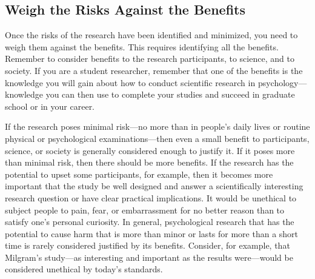 \subsection{Weigh the Risks Against the Benefits}
Once the risks of the research have been identified and minimized, you need to weigh them against the benefits.
This requires identifying all the benefits. Remember to consider benefits to the research participants, to science, and to society. If you are a student researcher, remember that one of the benefits is the knowledge you will gain about how to conduct scientific research in psychology---knowledge you can then use to complete your studies and succeed in graduate school or in your career.

If the research poses minimal risk---no more than in people's daily lives or routine physical or psychological examinations---then even a small benefit to participants, science, or society is generally considered enough to justify it. If it poses more than minimal risk, then there should be more benefits. If the research has the potential to upset some participants, for example, then it becomes more important that the study be well designed and answer a scientifically interesting research question or have clear practical implications. It would be unethical to subject people to pain, fear, or embarrassment for no better reason than to satisfy one's personal curiosity. In general, psychological research that has the potential to cause harm that is more than minor or lasts for more than a short time is rarely considered justified by its benefits. Consider, for example, that Milgram's study---as interesting and important as the results were---would be considered unethical by today's standards.

